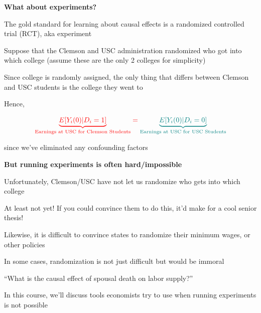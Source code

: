 \documentclass[11pt, aspectratio=169]{beamer}
\newenvironment{wideitemize}{\itemize\addtolength{\itemsep}{5pt}}{\enditemize}
\begin{document}
\begin{frame}{\bf \large What about experiments?}
	\begin{wideitemize}
		\item
		The gold standard for learning about causal effects is a randomized controlled trial (RCT), aka experiment
		
		\item
		Suppose that the Clemson and USC administration randomized who got into which college (assume these are the only 2 colleges for simplicity)
		
		\item
		Since college is randomly assigned, the only thing that differs between Clemson and USC students is the college they went to
		
		\item
		Hence, 
		
		$$ \color{red}{ \underbrace{E[ Y_i(0) | D_i=1  ] }_{\text{Earnings at USC for Clemson Students}}} = \color{teal}{ \underbrace{E[ Y_i(0) | D_i=0 ] }_{\text{Earnings at USC for USC Students}}}$$
		
		since we've eliminated any confounding factors
		
		
	\end{wideitemize}
\end{frame}

\begin{frame}{\bf \large But running experiments is often hard/impossible \hyperlink{splitprob}{}}
	\begin{wideitemize}
		
		\item
		Unfortunately, Clemson/USC have not let us randomize who gets into which college
		\begin{wideitemize}
			\item
			At least not yet! If you could convince them to do this, it'd make for a cool senior thesis! 
		\end{wideitemize}
		
		
		\item
		Likewise, it is difficult to convince states to randomize their minimum wages, or other policies
		
		\item
		In some cases, randomization is not just difficult but would be immoral 
		
		\begin{wideitemize}
			\item 
			``What is the causal effect of spousal death on labor supply?''
		\end{wideitemize}	
		
		\item
		In this course, we'll discuss tools economists try to use when running experiments is not possible
	\end{wideitemize}
\end{frame}
\end{document}
